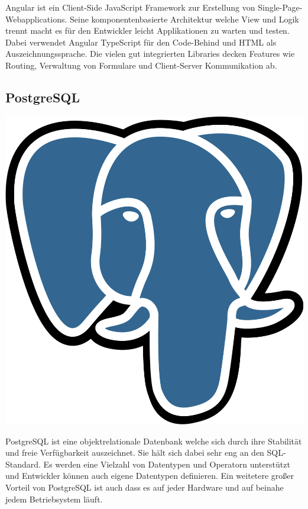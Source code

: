 Angular ist ein Client-Side JavaScript Framework zur Erstellung von Single-Page-Webapplications. 
Seine komponentenbasierte Architektur welche View und Logik trennt macht es für den Entwickler leicht 
Applikationen zu warten und testen. Dabei verwendet Angular TypeScript für den Code-Behind und HTML als Auszeichnungssprache. 
Die vielen gut integrierten Libraries decken Features wie Routing, Verwaltung von Formulare und Client-Server Kommunikation ab. 

\subsection{PostgreSQL}
\includegraphics[scale=0.015]{pics/postgresqlLogo.svg.png}

PostgreSQL ist eine objektrelationale Datenbank welche sich durch ihre Stabilität und freie Verfügbarkeit auszeichnet. 
Sie hält sich dabei sehr eng an den SQL-Standard. Es werden eine Vielzahl von Datentypen und Operatorn unterstützt und 
Entwickler können auch eigene Datentypen definieren. Ein weitetere großer Vorteil von PostgreSQL ist auch dass es auf 
jeder Hardware und auf beinahe jedem Betriebsystem läuft. 
